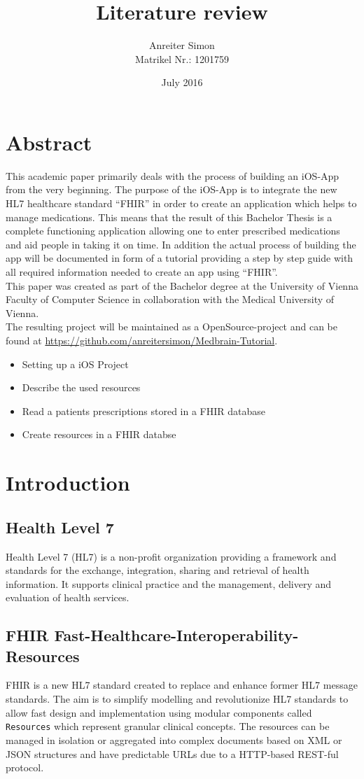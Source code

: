 \documentclass{article}
\title{Literature review}
\author{
    \large{Anreiter Simon} \\
    \small{Matrikel Nr.: 1201759}
}
\date{July 2016}
\begin{document}


\section*{Abstract}
This academic paper primarily deals with the process of building an iOS-App from the very beginning. The purpose of the iOS-App is to integrate the new HL7 healthcare standard “FHIR” in order to create an application which helps to manage medications. This means that the result of this Bachelor Thesis is a complete functioning application allowing one to enter prescribed medications and aid people in taking it on time. In addition the actual process of building the app will be documented in form of a tutorial providing a step by step guide with all required information needed to create an app using “FHIR”.
\\
This paper was created as part of the Bachelor degree at the University of Vienna Faculty of Computer Science in collaboration with the Medical University of Vienna.
\\
The resulting project will be maintained as a OpenSource-project and can be found at \url{https://github.com/anreitersimon/Medbrain-Tutorial}.
\\
\begin{itemize}
  \item
    Setting up a iOS Project
  \item
    Describe the used resources
  \item
    Read a patients prescriptions stored in a FHIR database
  \item
    Create resources in a FHIR databse
\end{itemize}
\newpage

\tableofcontents
\newpage

\section{Introduction}
\subsection{Health Level 7}
Health Level 7 (HL7) is a non-profit organization providing a framework and standards for the exchange, integration, sharing and retrieval of health information.
It supports clinical practice and the management, delivery and evaluation of health services. \citep{hl7}

\subsection{FHIR Fast-Healthcare-Interoperability-Resources}
FHIR \citep{fhir} is a new HL7 standard created to replace and enhance former HL7 message standards. The aim is to simplify modelling and revolutionize HL7 standards to allow fast design and implementation using modular components called \texttt{Resources} which represent granular clinical concepts. The resources can be managed in isolation or aggregated into complex documents based on XML or JSON structures and have predictable URLs due to a HTTP-based REST-ful protocol. \citep{fhir-wiki}
\end{document}
